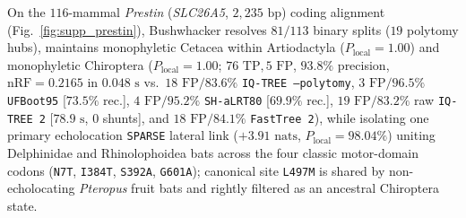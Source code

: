 \documentclass[12pt]{article}
\begin{document}
On the $116$-mammal \textit{Prestin} (\textit{SLC26A5}, $2,235\text{ bp}$) coding alignment \cite{liu2010convergent,li2010hearing} (Fig.~\ref{fig:supp_prestin}), Bushwhacker resolves $81/113$ binary splits ($19$ polytomy hubs), maintains monophyletic Cetacea within Artiodactyla ($P_{\text{local}}=1.00$) and monophyletic Chiroptera ($P_{\text{local}}=1.00$; $76\text{ TP}, 5\text{ FP}$, $93.8\%$ precision, $\text{nRF}=0.2165$ in $0.048\text{ s}$ vs.\ $18\text{ FP}/83.6\%$ \texttt{IQ-TREE --polytomy}, $3\text{ FP}/96.5\%$ \texttt{UFBoot95} [$73.5\%$ rec.], $4\text{ FP}/95.2\%$ \texttt{SH-aLRT80} [$69.9\%$ rec.], $19\text{ FP}/83.2\%$ raw \texttt{IQ-TREE 2} [$78.9\text{ s}$, $0$ shunts], and $18\text{ FP}/84.1\%$ \texttt{FastTree 2}), while isolating one primary echolocation \texttt{SPARSE} lateral link ($+3.91\text{ nats}$, $P_{\text{local}} = 98.04\%$) uniting Delphinidae and Rhinolophoidea bats across the four classic motor-domain codons (\texttt{N7T}, \texttt{I384T}, \texttt{S392A}, \texttt{G601A}); canonical site \texttt{L497M} is shared by non-echolocating \textit{Pteropus} fruit bats and rightly filtered as an ancestral Chiroptera state.
\end{document}
